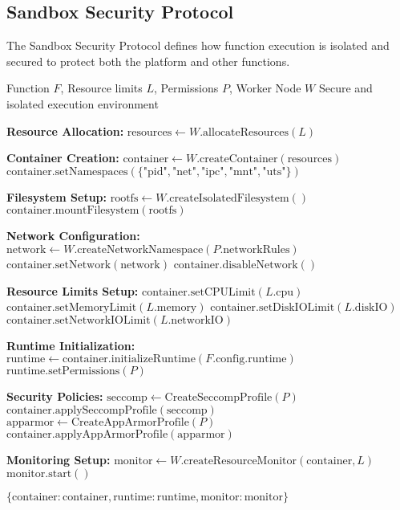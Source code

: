\subsection{Sandbox Security Protocol}
\label{subsec:sandbox-protocol}

The Sandbox Security Protocol defines how function execution is isolated and secured to protect both the platform and other functions.

\begin{protocol}
\label{prot:sandbox-creation}
\begin{algorithmic}[1]
\Require Function $F$, Resource limits $L$, Permissions $P$, Worker Node $W$
\Ensure Secure and isolated execution environment

\State \textbf{Resource Allocation:}
\State $\text{resources} \gets W.\text{allocateResources}(L)$

\State \textbf{Container Creation:}
\State $\text{container} \gets W.\text{createContainer}(\text{resources})$
\State $\text{container}.\text{setNamespaces}(\{\text{"pid"}, \text{"net"}, \text{"ipc"}, \text{"mnt"}, \text{"uts"}\})$

\State \textbf{Filesystem Setup:}
\State $\text{rootfs} \gets W.\text{createIsolatedFilesystem}()$
\State $\text{container}.\text{mountFilesystem}(\text{rootfs})$

\State \textbf{Network Configuration:}
    \State $\text{network} \gets W.\text{createNetworkNamespace}(P.\text{networkRules})$
    \State $\text{container}.\text{setNetwork}(\text{network})$
\Else
    \State $\text{container}.\text{disableNetwork}()$
\EndIf

\State \textbf{Resource Limits Setup:}
\State $\text{container}.\text{setCPULimit}(L.\text{cpu})$
\State $\text{container}.\text{setMemoryLimit}(L.\text{memory})$
\State $\text{container}.\text{setDiskIOLimit}(L.\text{diskIO})$
\State $\text{container}.\text{setNetworkIOLimit}(L.\text{networkIO})$

\State \textbf{Runtime Initialization:}
\State $\text{runtime} \gets \text{container}.\text{initializeRuntime}(F.\text{config}.\text{runtime})$
\State $\text{runtime}.\text{setPermissions}(P)$

\State \textbf{Security Policies:}
\State $\text{seccomp} \gets \text{CreateSeccompProfile}(P)$
\State $\text{container}.\text{applySeccompProfile}(\text{seccomp})$
\State $\text{apparmor} \gets \text{CreateAppArmorProfile}(P)$
\State $\text{container}.\text{applyAppArmorProfile}(\text{apparmor})$

\State \textbf{Monitoring Setup:}
\State $\text{monitor} \gets W.\text{createResourceMonitor}(\text{container}, L)$
\State $\text{monitor}.\text{start}()$

\State \Return $\{\text{container}: \text{container}, \text{runtime}: \text{runtime}, \text{monitor}: \text{monitor}\}$
\end{algorithmic}
\end{protocol}

